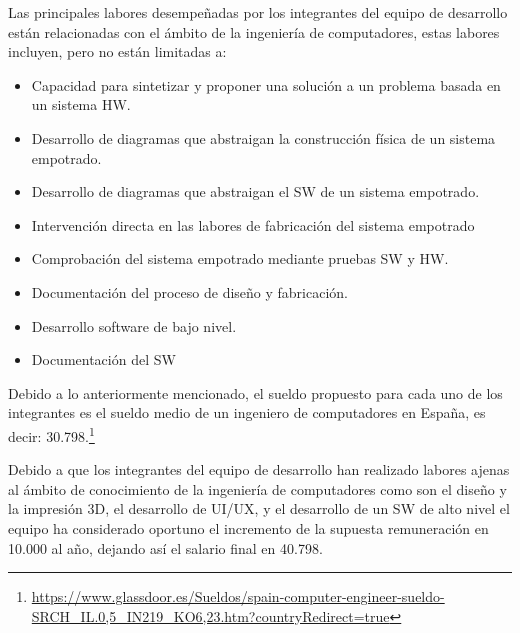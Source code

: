 Las principales labores desempeñadas por los integrantes del equipo de desarrollo están relacionadas con el ámbito de la ingeniería de computadores, estas labores incluyen, pero no están limitadas a:

\begin{itemize}
    \item Capacidad para sintetizar y proponer una solución a un problema basada en un sistema \ac{HW}.
    \item Desarrollo de diagramas que abstraigan la construcción física de un sistema empotrado.
    \item Desarrollo de diagramas que abstraigan el \ac{SW} de un sistema empotrado.
    \item Intervención directa en las labores de fabricación del sistema empotrado
    \item Comprobación del sistema empotrado mediante pruebas \ac{SW} y \ac{HW}.
    \item Documentación del proceso de diseño y fabricación.
    \item Desarrollo software de bajo nivel.
    \item Documentación del \ac{SW}
\end{itemize}

Debido a lo anteriormente mencionado, el sueldo propuesto para cada uno de los integrantes es el sueldo medio de un ingeniero de computadores en España, es decir: 30.798.\footnote{\url{https://www.glassdoor.es/Sueldos/spain-computer-engineer-sueldo-SRCH_IL.0,5_IN219_KO6,23.htm?countryRedirect=true}}

Debido a que los integrantes del equipo de desarrollo han realizado labores ajenas al ámbito de conocimiento de la ingeniería de computadores como son el diseño y la impresión 3D, el desarrollo de UI/UX, y el desarrollo de un \ac{SW} de alto nivel el equipo ha considerado oportuno el incremento de la supuesta remuneración en 10.000\EUR{} al año, dejando así el salario final en 40.798.